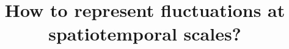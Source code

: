 \documentclass[11pt]{article}
\begin{document}
\thispagestyle{empty}
\title{{\bf How to represent fluctuations at spatiotemporal scales?}}
\vspace{-0.1 in}
\end{document}
